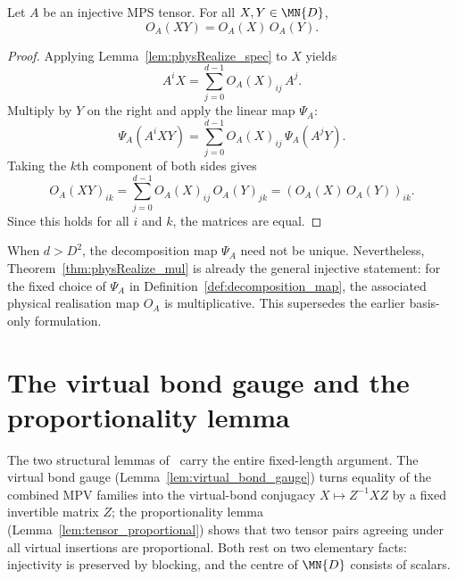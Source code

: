 \begin{theorem}%
    \label{thm:physRealize_mul}
    \leanok
    Let $A$ be an injective MPS tensor.
    For all $X, Y \in \MN{D}$,
    \[
        O_A(XY) = O_A(X)\, O_A(Y).
    \]
\end{theorem}

\begin{proof}
    \leanok
    Applying Lemma~\ref{lem:physRealize_spec} to $X$ yields
    \[
        A^i X = \sum_{j=0}^{d-1} O_A(X)_{ij}\, A^j.
    \]
    Multiply by $Y$ on the right and apply the linear map $\Psi_A$:
    \[
        \Psi_A(A^i XY)
        = \sum_{j=0}^{d-1} O_A(X)_{ij}\, \Psi_A(A^j Y).
    \]
    Taking the $k$th component of both sides gives
    \[
        O_A(XY)_{ik}
        = \sum_{j=0}^{d-1} O_A(X)_{ij}\, O_A(Y)_{jk}
        = (O_A(X)\, O_A(Y))_{ik}.
    \]
    Since this holds for all $i$ and $k$, the matrices are equal.
\end{proof}

\begin{remark}
    \label{rem:physRealize_mul_general}
    When $d > D^2$, the decomposition map $\Psi_A$ need not be unique.
    Nevertheless, Theorem~\ref{thm:physRealize_mul} is already the
    general injective statement: for the fixed choice of $\Psi_A$ in
    Definition~\ref{def:decomposition_map}, the associated physical
    realisation map $O_A$ is multiplicative.
    This supersedes the earlier basis-only formulation.
\end{remark}

\section{The virtual bond gauge and the proportionality lemma}%
\label{sec:virtual_bond_gauge}

The two structural lemmas of~\cite{Molnar2018NormalPEPS} carry the entire
fixed-length argument. The virtual bond gauge
(Lemma~\ref{lem:virtual_bond_gauge}) turns equality of the combined MPV
families into the virtual-bond conjugacy $X\mapsto Z^{-1}XZ$ by a fixed
invertible matrix $Z$; the proportionality
lemma (Lemma~\ref{lem:tensor_proportional}) shows that two tensor pairs
agreeing under all virtual insertions are proportional. Both rest on two
elementary facts: injectivity is preserved by blocking, and the centre of
$\MN{D}$ consists of scalars.

